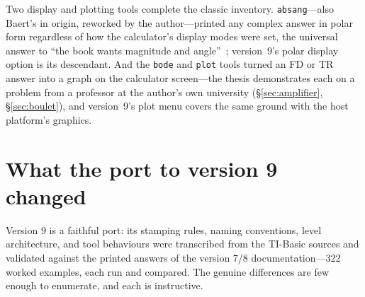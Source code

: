 \documentclass[11pt,oneside]{report}
\newcommand{\code}[1]{\texttt{#1}}
\begin{document}
Two display and plotting tools complete the classic
inventory. \code{absang}---also Baert's in origin, reworked by the
author---printed any complex answer in polar form regardless of how
the calculator's display modes were set, the universal answer to
``the book wants magnitude and angle''~\cite[\S6.1.2]{thesis2000};
version~9's polar display option is its descendant. And the
\code{bode} and \code{plot} tools turned an FD or TR answer into a
graph on the calculator screen---the thesis demonstrates each on a
problem from a professor at the author's own university
(\S\ref{sec:amplifier}, \S\ref{sec:boulet}), and version~9's plot
menu covers the same ground with the host platform's graphics.

\section{What the port to version 9 changed}
\label{sec:portchanges}

Version 9 is a faithful port: its stamping rules, naming conventions,
level architecture, and tool behaviours were transcribed from the
TI-Basic sources and validated against the printed answers of the
version 7/8 documentation---322 worked examples, each run and
compared. The genuine differences are few enough to enumerate, and
each is instructive.
\end{document}
